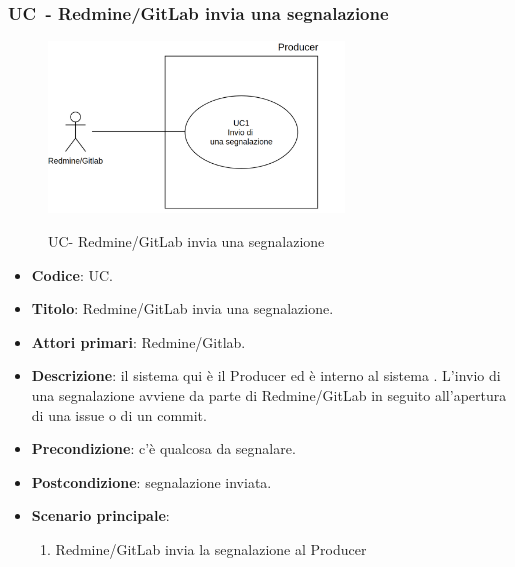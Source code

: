 \subsubsection{UC\theuccount\ - Redmine/GitLab invia una segnalazione}
    \begin{figure}[H]
		\centering
		\includegraphics[width=0.7\textwidth]{img/UC1.png}\\
		\caption{UC\theuccount - Redmine/GitLab invia una segnalazione}
	\end{figure}
	\begin{itemize}
		\item \textbf{Codice}: UC\theuccount.
		\item \textbf{Titolo}: Redmine/GitLab invia una segnalazione.
		\item \textbf{Attori primari}: Redmine/Gitlab.
		\item \textbf{Descrizione}:
		 il sistema qui è il Producer ed è interno al sistema \progetto.
		 L'invio di una segnalazione avviene da parte di Redmine/GitLab in seguito all'apertura di una issue o di un commit.		 
		\item \textbf{Precondizione}: c'è qualcosa da segnalare.
		\item \textbf{Postcondizione}: segnalazione inviata.
		\item \textbf{Scenario principale}: 
		\begin{enumerate}
			\item Redmine/GitLab invia la segnalazione al Producer
		\end{enumerate}
		
	\end{itemize}

